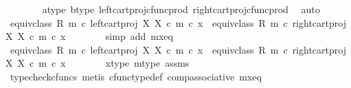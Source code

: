 \begin{isabellebody}
\ \ \ \ \ \ \isamarkupfalse%
\ a{\isacharunderscore}{\kern0pt}type\ b{\isacharunderscore}{\kern0pt}type\ left{\isacharunderscore}{\kern0pt}cart{\isacharunderscore}{\kern0pt}proj{\isacharunderscore}{\kern0pt}cfunc{\isacharunderscore}{\kern0pt}prod\ right{\isacharunderscore}{\kern0pt}cart{\isacharunderscore}{\kern0pt}proj{\isacharunderscore}{\kern0pt}cfunc{\isacharunderscore}{\kern0pt}prod\ \isamarkupfalse%
\ auto\isanewline
\ \ \ \ \isamarkupfalse%
\ \isamarkupfalse%
\ {\isachardoublequoteopen}equiv{\isacharunderscore}{\kern0pt}class\ {\isacharparenleft}{\kern0pt}R{\isacharcomma}{\kern0pt}\ m{\isacharparenright}{\kern0pt}\ {\isasymcirc}\isactrlsub c\ left{\isacharunderscore}{\kern0pt}cart{\isacharunderscore}{\kern0pt}proj\ X\ X\ {\isasymcirc}\isactrlsub c\ m\ {\isasymcirc}\isactrlsub c\ x\ {\isacharequal}{\kern0pt}\ equiv{\isacharunderscore}{\kern0pt}class\ {\isacharparenleft}{\kern0pt}R{\isacharcomma}{\kern0pt}\ m{\isacharparenright}{\kern0pt}\ {\isasymcirc}\isactrlsub c\ right{\isacharunderscore}{\kern0pt}cart{\isacharunderscore}{\kern0pt}proj\ X\ X\ {\isasymcirc}\isactrlsub c\ m\ {\isasymcirc}\isactrlsub c\ x{\isachardoublequoteclose}\isanewline
\ \ \ \ \ \ \isamarkupfalse%
\ {\isacharparenleft}{\kern0pt}simp\ add{\isacharcolon}{\kern0pt}\ m{\isacharunderscore}{\kern0pt}x{\isacharunderscore}{\kern0pt}eq{\isacharparenright}{\kern0pt}\isanewline
\ \ \ \ \isamarkupfalse%
\ \isamarkupfalse%
\ {\isachardoublequoteopen}{\isacharparenleft}{\kern0pt}equiv{\isacharunderscore}{\kern0pt}class\ {\isacharparenleft}{\kern0pt}R{\isacharcomma}{\kern0pt}\ m{\isacharparenright}{\kern0pt}\ {\isasymcirc}\isactrlsub c\ left{\isacharunderscore}{\kern0pt}cart{\isacharunderscore}{\kern0pt}proj\ X\ X\ {\isasymcirc}\isactrlsub c\ m{\isacharparenright}{\kern0pt}\ {\isasymcirc}\isactrlsub c\ x\ {\isacharequal}{\kern0pt}\ {\isacharparenleft}{\kern0pt}equiv{\isacharunderscore}{\kern0pt}class\ {\isacharparenleft}{\kern0pt}R{\isacharcomma}{\kern0pt}\ m{\isacharparenright}{\kern0pt}\ {\isasymcirc}\isactrlsub c\ right{\isacharunderscore}{\kern0pt}cart{\isacharunderscore}{\kern0pt}proj\ X\ X\ {\isasymcirc}\isactrlsub c\ m{\isacharparenright}{\kern0pt}\ {\isasymcirc}\isactrlsub c\ x{\isachardoublequoteclose}\isanewline
\ \ \ \ \ \ \isamarkupfalse%
\ x{\isacharunderscore}{\kern0pt}type\ m{\isacharunderscore}{\kern0pt}type\ assms\ \isamarkupfalse%
\ {\isacharparenleft}{\kern0pt}typecheck{\isacharunderscore}{\kern0pt}cfuncs{\isacharcomma}{\kern0pt}\ metis\ cfunc{\isacharunderscore}{\kern0pt}type{\isacharunderscore}{\kern0pt}def\ comp{\isacharunderscore}{\kern0pt}associative\ m{\isacharunderscore}{\kern0pt}x{\isacharunderscore}{\kern0pt}eq{\isacharparenright}{\kern0pt}\isanewline

\end{isabellebody}

